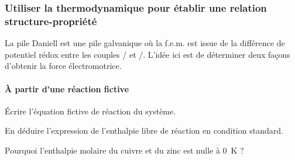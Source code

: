 \subsubsection{Utiliser la thermodynamique pour établir une relation structure-propriété}
\label{subsubsection:relation_structure-propriete}

\setcounter{equation}{0}
\setcounter{Q}{0}

La pile Daniell est une pile galvanique où la f.e.m. est issue de la différence de potentiel rédox entre les couples / et /. L'idée ici est de déterminer deux façons d'obtenir la force électromotrice.%

\paragraph*{\`{A} partir d'une réaction fictive}

\Q \'{E}crire l'équation fictive de réaction du système.

\Q En déduire l'expression de l'enthalpie libre de réaction en condition standard.

\Q Pourquoi l'enthalpie molaire du cuivre et du zinc est nulle à \SI{0}{\kelvin} ?

